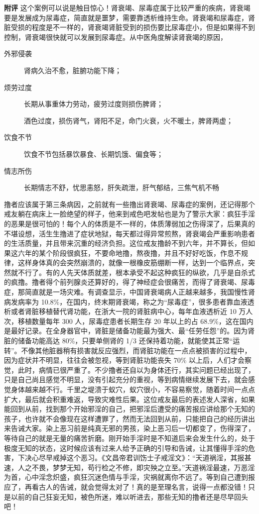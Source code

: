 \begin{case}
    \textbf{附评} 这个案例可以说是触目惊心！肾衰竭、尿毒症属于比较严重的疾病，肾衰竭要是发展成为尿毒症，简直就是噩梦，需要靠透析维持生命。肾衰竭和尿毒症，肾脏受损的程度是不一样的，肾衰竭肾脏受到的损伤要比尿毒症小，但是如果得不到控制，肾衰竭很快就可以发展到尿毒症。从中医角度解读肾衰竭的原因，\begin{description}
        \item[外邪侵袭] 肾病久治不愈，脏腑功能下降；
        \item[烦劳过度] 长期从事重体力劳动，疲劳过度则损伤脾肾；
        \item[] 酒色过度，损伤肾气，肾阳不足，命门火衰，火不暖土，脾肾两虚；
        \item[饮食不节] 饮食不节包括暴饮暴食、长期饥饿、偏食等；
        \item[情志所伤] 长期情志不舒，忧思恚怒，肝失疏泄，肝气郁结，三焦气机不畅
    \end{description} 撸者应该属于第三条病因，之前就有一些撸出肾衰竭、尿毒症的案例，还记得那个戒友躺在病床上一脸绝望的样子，他来到戒色吧发帖也是为了警示大家：疯狂手淫的恶果是很可怕的！每个人的体质是不一样的，体质薄弱加之伤得深了，后果真的不堪设想，活生生撸进了症状地狱，每天都过得异常煎熬，肾衰竭会严重影响患者的生活质量，并且带来沉重的经济负担。这位戒友撸龄不到六年，并不算长，但如果这六年的某个阶段很疯狂，不要命地撸，熬夜撸，并且不好好吃饭，作息不规律，这样身体真的会突然崩溃的，就像一根橡皮筋绷断一样，达到一个临界点，突然就不行了。有的人先天体质就差，根本承受不起这种疯狂的纵欲，几乎是自杀式的疯撸。撸者得个前列腺炎还算好的，得了神经症会很痛苦，而得了肾衰竭、尿毒症，那简直就是一场灾难。有调查显示，中国肾衰竭病人正越来越多，我国慢性肾病发病率为 10.8\%，在国内，终末期肾衰竭，称之为“尿毒症”，很多患者靠血液透析或者肾脏移植替代肾功能，在浙大一院的肾脏病中心，每年血液透析近 10 万人次，移植数量每年 300 人，尿毒症患者长期生存 20 年以上的占 68.9\%，这在国内是最好记录。在全身器官中，肾脏是储备功能最为强大、最“任劳任怨”的。因为肾脏的储备功能高达 80\%，只要单侧肾的 1/3 还保持着功能，就能使其正常“运转”。不像其他脏器稍有损害就反应强烈，而肾脏功能在一点点被损害的过程中，因为症状并不明显，往往会被忽视，等到肾脏功能丧失 70\% 以上后，人们才会察觉，此时，病情已很严重了。不少撸者还自以为身体还行，其实问题已经出现了，只是自己尚且感觉不明显，没有引起充分的重视，等到病情继续发展下去，就会感觉身体越来越不行。千里之堤溃于蚁穴，蚁穴很小，不容易察觉，随着时间一点点扩大，最后就会积重难返，导致灾难性后果。这位戒友最后的表述发人深省，如果能回到从前，找到那个开始邪淫的自己，把邪淫后遭受的痛苦报应讲给那个无知的孩子，也许就不会像现在这样遭罪了，然而无法回到从前，只能把自己的经历讲出来告诫大家。染上恶习前是纯真无邪的男孩，染上恶习后一切都变了，伤得深了，等待自己的就是无量的痛苦折磨。刚开始手淫时是不知道后来会发生什么的，处于极度无知的状态，这时候应该有过来人给予正确的引导和告诫，让其懂得手淫的危害，下决心尽早戒掉这个恶习。《文昌帝君训饬士子戒淫文》：“天道祸淫，其报甚速，人之不畏，梦梦无知，苟行检之不修，即灾殃之立至。”天道祸淫最速，万恶淫为首，心中淫念炽盛，疯狂沉迷色情与手淫，灾祸就离你不远了。等到自己遭到报应了，再看古人的告诫，就会觉得太对了！真的是至理名言，说得一点都没错！只是以前的自己狂妄无知，被色所迷，难以听进去，那些无知的撸者还是尽早回头吧！
\end{case}

